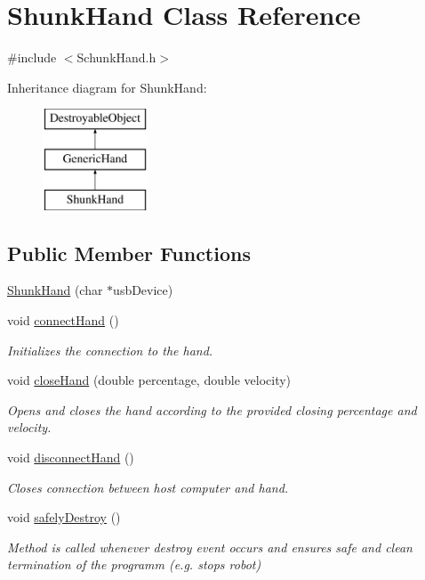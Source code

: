 \hypertarget{classShunkHand}{\section{\-Shunk\-Hand \-Class \-Reference}
\label{classShunkHand}
}


{\ttfamily \#include $<$\-Schunk\-Hand.\-h$>$}

\-Inheritance diagram for \-Shunk\-Hand\-:\begin{figure}[H]
\begin{center}
\leavevmode
\includegraphics[height=3.000000cm]{classShunkHand}
\end{center}
\end{figure}
\subsection*{\-Public \-Member \-Functions}
\begin{DoxyCompactItemize}
\item 
\hyperlink{classShunkHand_a70c10a55421f76ecfa074069f10001ee}{\-Shunk\-Hand} (char $\ast$usb\-Device)
\item 
void \hyperlink{classShunkHand_a2a280e28dddb3467721f6ad2c0db7f30}{connect\-Hand} ()
\begin{DoxyCompactList}\small\item\em \-Initializes the connection to the hand. \end{DoxyCompactList}\item 
void \hyperlink{classShunkHand_a45dcb80e0645a46534398dbf7d8956f2}{close\-Hand} (double percentage, double velocity)
\begin{DoxyCompactList}\small\item\em \-Opens and closes the hand according to the provided closing percentage and velocity. \end{DoxyCompactList}\item 
void \hyperlink{classShunkHand_a11a34a1d7d19ab608c04184f7fdd1fbc}{disconnect\-Hand} ()
\begin{DoxyCompactList}\small\item\em \-Closes connection between host computer and hand. \end{DoxyCompactList}\item 
void \hyperlink{classShunkHand_a7f6fc5b63c54e07d11dda1de1f503050}{safely\-Destroy} ()
\begin{DoxyCompactList}\small\item\em \-Method is called whenever destroy event occurs and ensures safe and clean termination of the programm (e.\-g. stops robot) \end{DoxyCompactList}\end{DoxyCompactItemize}


